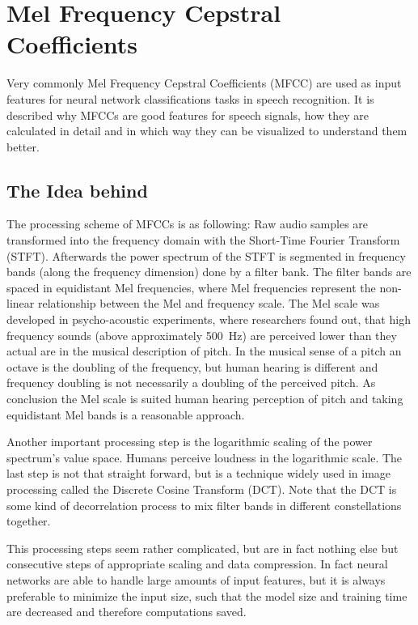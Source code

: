 
\section{Mel Frequency Cepstral Coefficients}\label{sec:signal_mfcc}
\thesisStateNotReady
Very commonly Mel Frequency Cepstral Coefficients (MFCC) are used as input features for neural network classifications tasks in speech recognition.
It is described why MFCCs are good features for speech signals, how they are calculated in detail and in which way they can be visualized to understand them better.



\subsection{The Idea behind}
The processing scheme of MFCCs is as following:
Raw audio samples are transformed into the frequency domain with the Short-Time Fourier Transform (STFT).
Afterwards the power spectrum of the STFT is segmented in frequency bands (along the frequency dimension) done by a filter bank.
The filter bands are spaced in equidistant Mel frequencies, where Mel frequencies represent the non-linear relationship between the Mel and frequency scale.
The Mel scale was developed in psycho-acoustic experiments, where researchers found out, that high frequency sounds (above approximately \SI{500}{\hertz}) are perceived lower than they actual are in the musical description of pitch.
In the musical sense of a pitch an octave is the doubling of the frequency, but human hearing is different and frequency doubling is not necessarily a doubling of the perceived pitch.
As conclusion the Mel scale is suited human hearing perception of pitch and taking equidistant Mel bands is a reasonable approach.

Another important processing step is the logarithmic scaling of the power spectrum's value space.
Humans perceive loudness in the logarithmic scale.
The last step is not that straight forward, but is a technique widely used in image processing called the Discrete Cosine Transform (DCT).
Note that the DCT is some kind of decorrelation process to mix filter bands in different constellations together.

This processing steps seem rather complicated, but are in fact nothing else but consecutive steps of appropriate scaling and data compression.
In fact neural networks are able to handle large amounts of input features, but it is always preferable to minimize the input size, such that the model size and training time are decreased and therefore computations saved.


